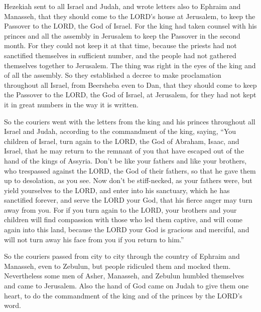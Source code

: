 \mychapter{} \myverse*{}Hezekiah sent to all Israel and Judah, and wrote letters also
to Ephraim and Manasseh, that they should come to the LORD’s house at Jerusalem, to keep the Passover
to the LORD, the God of Israel.
\myverse{}For the king had taken counsel with his princes and all the assembly in Jerusalem
to keep the Passover in the second month.
\myverse{}For they could not keep it at that time, because the priests had not sanctified
themselves in sufficient number, and the people had not gathered themselves together to Jerusalem.
\myverse{}The thing was right in the eyes of the king and of all the assembly.
\myverse{}So they established a decree to make proclamation throughout all Israel, from
Beersheba even to Dan, that they should come to keep the Passover to the LORD, the God of Israel, at Jerusalem,
for they had not kept it in great numbers in the way it is written.

\myverse{}So the couriers went with the letters from the king and his princes
throughout all Israel and Judah, according to the commandment of the king, saying, “You children of Israel,
turn again to the LORD, the God of Abraham, Isaac, and Israel, that he may return to the remnant of you
that have escaped out of the hand of the kings of Assyria.
\myverse{}Don’t be like your fathers and like your brothers, who trespassed against the
LORD, the God of their fathers, so that he gave them up to desolation, as you see.
\myverse{}Now don’t be stiff-necked, as your fathers were, but yield yourselves to the
LORD, and enter into his sanctuary, which he has sanctified forever, and serve the LORD your God, that
his fierce anger may turn away from you.
\myverse{}For if you turn again to the LORD, your brothers and your children will find
compassion with those who led them captive, and will come again into this land, because the LORD your
God is gracious and merciful, and will not turn away his face from you if you return to him.”

\myverse{}So the couriers passed from city to city through the country
of Ephraim and Manasseh, even to Zebulun, but people ridiculed them and mocked them.
\myverse{}Nevertheless some men of Asher, Manasseh, and Zebulun humbled themselves
and came to Jerusalem.
\myverse{}Also the hand of God came on Judah to give them one heart, to do the commandment
of the king and of the princes by the LORD’s word.

